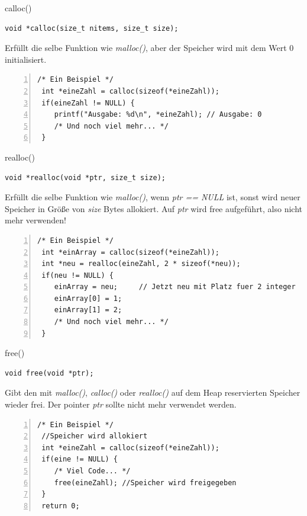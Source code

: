 
\begin{frame}[fragile]{calloc()}
    \begin{lstlisting}[numbers=none]
void *calloc(size_t nitems, size_t size);    \end{lstlisting}
Erfüllt die selbe Funktion wie \textit{malloc()}, aber der Speicher wird mit dem Wert 0 initialisiert.
    \begin{lstlisting}[numbers=left]
/* Ein Beispiel */
 int *eineZahl = calloc(sizeof(*eineZahl));
 if(eineZahl != NULL) {
    printf("Ausgabe: %d\n", *eineZahl); // Ausgabe: 0
    /* Und noch viel mehr... */
 }\end{lstlisting}
\end{frame}

\begin{frame}[fragile]{realloc()}
    \begin{lstlisting}[numbers=none]
void *realloc(void *ptr, size_t size);    \end{lstlisting}
Erfüllt die selbe Funktion wie \textit{malloc()}, wenn \textit{ptr == NULL} ist, sonst wird neuer Speicher in Größe von \textit{size} Bytes allokiert. Auf \textit{ptr} wird free aufgeführt, also nicht mehr verwenden! 
    \begin{lstlisting}[numbers=left]
/* Ein Beispiel */
 int *einArray = calloc(sizeof(*eineZahl));
 int *neu = realloc(eineZahl, 2 * sizeof(*neu));
 if(neu != NULL) {
    einArray = neu;     // Jetzt neu mit Platz fuer 2 integer
    einArray[0] = 1; 
    einArray[1] = 2;
    /* Und noch viel mehr... */
 }\end{lstlisting}
\end{frame}

\begin{frame}[fragile]{free()}
    \begin{lstlisting}[numbers=none]
void free(void *ptr);    \end{lstlisting}
Gibt den mit \textit{malloc()}, \textit{calloc()} oder \textit{realloc()} auf dem Heap reservierten Speicher wieder frei. Der pointer \textit{ptr} sollte nicht mehr verwendet werden.
    \begin{lstlisting}[numbers=left]
/* Ein Beispiel */
 //Speicher wird allokiert
 int *eineZahl = calloc(sizeof(*eineZahl));
 if(eine != NULL) {
    /* Viel Code... */
    free(eineZahl); //Speicher wird freigegeben
 }
 return 0;\end{lstlisting}
\end{frame}

